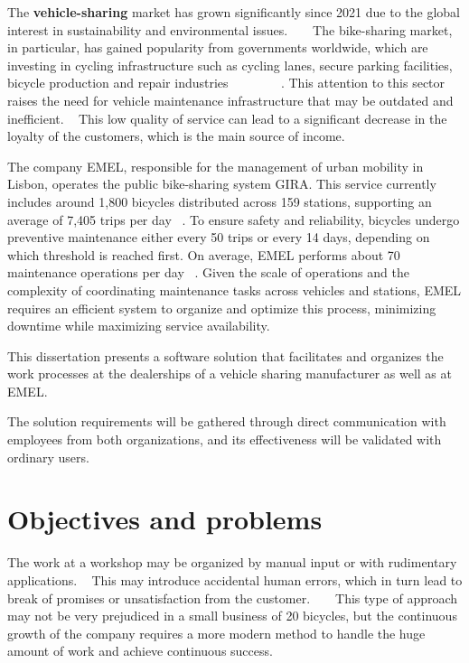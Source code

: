 The \textbf{vehicle-sharing} market has grown significantly since 2021 due to the global interest in sustainability and environmental issues. ~\cite{cohesionOpenData} ~\cite{bike_data_businessresearch}
The bike-sharing market, in particular, has gained popularity from governments worldwide, which are investing in cycling infrastructure such as cycling lanes, secure parking facilities, bicycle production and repair industries ~\cite{Clercq2023} ~\cite{Cerro2024} ~\cite{European_declararion_on_cycling} ~\cite{bike_data_businessresearch} ~\cite{cohesionOpenData}.
This attention to this sector raises the need for vehicle maintenance infrastructure that may be outdated and inefficient. ~\cite{MAS_MOTORS}
This low quality of service can lead to a significant decrease in the loyalty of the customers, which is the main source of income. ~\cite{Setting_the_after_sale_process}

The company \ac{EMEL}, responsible for the management of urban mobility in Lisbon, operates the public bike-sharing system GIRA. This service currently includes around 1,800 bicycles distributed across 159 stations, supporting an average of 7,405 trips per day ~\cite{Gira_Trips}. To ensure safety and reliability, bicycles undergo preventive maintenance either every 50 trips or every 14 days, depending on which threshold is reached first. On average, \ac{EMEL} performs about 70 maintenance operations per day ~\cite{Gira_Maintenance}. Given the scale of operations and the complexity of coordinating maintenance tasks across vehicles and stations, \ac{EMEL} requires an efficient system to organize and optimize this process, minimizing downtime while maximizing service availability.

This dissertation presents a software solution that facilitates and organizes the work processes at the dealerships of a vehicle sharing manufacturer as well as at \ac{EMEL}. 

The solution requirements will be gathered through direct communication with employees from both organizations, and its effectiveness will be validated with ordinary users.


\section{Objectives and problems}

The work at a workshop may be organized by manual input or with rudimentary applications. ~\cite{MAS_MOTORS} 
This may introduce accidental human errors, which in turn lead to break of promises or unsatisfaction from the customer. ~\cite{MAS_MOTORS} ~\cite{Setting_the_after_sale_process}
This type of approach may not be very prejudiced in a small business of 20 bicycles, but the continuous growth of the company requires a more modern method to handle the huge amount of work and achieve continuous success. ~\cite{MAS_MOTORS}

